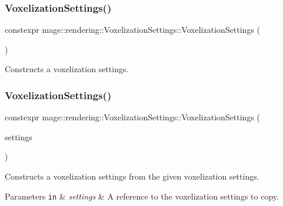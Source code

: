 \subsubsection{\texorpdfstring{Voxelization\+Settings()}{VoxelizationSettings()}\hspace{0.1cm}{\footnotesize\ttfamily [1/3]}}
{\footnotesize\ttfamily constexpr mage\+::rendering\+::\+Voxelization\+Settings\+::\+Voxelization\+Settings (\begin{DoxyParamCaption}{ }\end{DoxyParamCaption})}

Constructs a voxelization settings. \hypertarget{classmage_1_1rendering_1_1_voxelization_settings_a62f8755e86da892cd22467309fecfe95}{}\label{classmage_1_1rendering_1_1_voxelization_settings_a62f8755e86da892cd22467309fecfe95} 
\subsubsection{\texorpdfstring{Voxelization\+Settings()}{VoxelizationSettings()}\hspace{0.1cm}{\footnotesize\ttfamily [2/3]}}
{\footnotesize\ttfamily constexpr mage\+::rendering\+::\+Voxelization\+Settings\+::\+Voxelization\+Settings (\begin{DoxyParamCaption}\item[{const \hyperlink{classmage_1_1rendering_1_1_voxelization_settings}{Voxelization\+Settings} \&}]{settings }\end{DoxyParamCaption})\hspace{0.3cm}{\ttfamily [default]}}

Constructs a voxelization settings from the given voxelization settings.


\begin{DoxyParams}[1]{Parameters}
\mbox{\tt in}  & {\em settings} & A reference to the voxelization settings to copy. \\
\hline
\end{DoxyParams}
\hypertarget{classmage_1_1rendering_1_1_voxelization_settings_af706582ce61228cd994aa72c537aa020}{}\label{classmage_1_1rendering_1_1_voxelization_settings_af706582ce61228cd994aa72c537aa020} 
